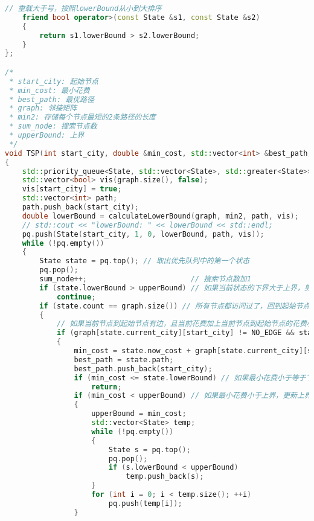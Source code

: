 \documentclass[lang=cn,11pt,a4paper]{elegantpaper}
\begin{document}
\begin{lstlisting}[language=c++]
    // 重载大于号，按照lowerBound从小到大排序
    friend bool operator>(const State &s1, const State &s2)
    {
        return s1.lowerBound > s2.lowerBound;
    }
};

/*
 * start_city: 起始节点
 * min_cost: 最小花费
 * best_path: 最优路径
 * graph: 邻接矩阵
 * min2: 存储每个节点最短的2条路径的长度
 * sum_node: 搜索节点数
 * upperBound: 上界
 */
void TSP(int start_city, double &min_cost, std::vector<int> &best_path, std::vector<std::vector<double>> &graph, std::vector<std::vector<double>> &min2, long long &sum_node, double upperBound)
{
    std::priority_queue<State, std::vector<State>, std::greater<State>> pq; // 优先队列，按照lowerBound从小到大排序
    std::vector<bool> vis(graph.size(), false);                             // 标记节点是否被访问过
    vis[start_city] = true;                                                 // 起始节点标记为已访问
    std::vector<int> path;                                                  // 当前路径
    path.push_back(start_city);                                             // 起始节点加入路径
    double lowerBound = calculateLowerBound(graph, min2, path, vis);        // 计算当前路径的下界
    // std::cout << "lowerBound: " << lowerBound << std::endl;                 // 输出下界
    pq.push(State(start_city, 1, 0, lowerBound, path, vis));                // 起始节点加入优先队列
    while (!pq.empty())
    {
        State state = pq.top(); // 取出优先队列中的第一个状态
        pq.pop();
        sum_node++;                        // 搜索节点数加1
        if (state.lowerBound > upperBound) // 如果当前状态的下界大于上界，剪枝
            continue;
        if (state.count == graph.size()) // 所有节点都访问过了，回到起始节点
        {
            // 如果当前节点到起始节点有边，且当前花费加上当前节点到起始节点的花费小于最小花费
            if (graph[state.current_city][start_city] != NO_EDGE && state.now_cost + graph[state.current_city][start_city] < min_cost)
            {
                min_cost = state.now_cost + graph[state.current_city][start_city];
                best_path = state.path;
                best_path.push_back(start_city);
                if (min_cost <= state.lowerBound) // 如果最小花费小于等于下界，直接返回，不再继续搜索，因为已经找到了最优解
                    return;
                if (min_cost < upperBound) // 如果最小花费小于上界，更新上界，并删除优先队列中大于当前最小花费的状态
                {
                    upperBound = min_cost;
                    std::vector<State> temp;
                    while (!pq.empty())
                    {
                        State s = pq.top();
                        pq.pop();
                        if (s.lowerBound < upperBound)
                            temp.push_back(s);
                    }
                    for (int i = 0; i < temp.size(); ++i)
                        pq.push(temp[i]);
                }
                    

\end{lstlisting}
\end{document}
